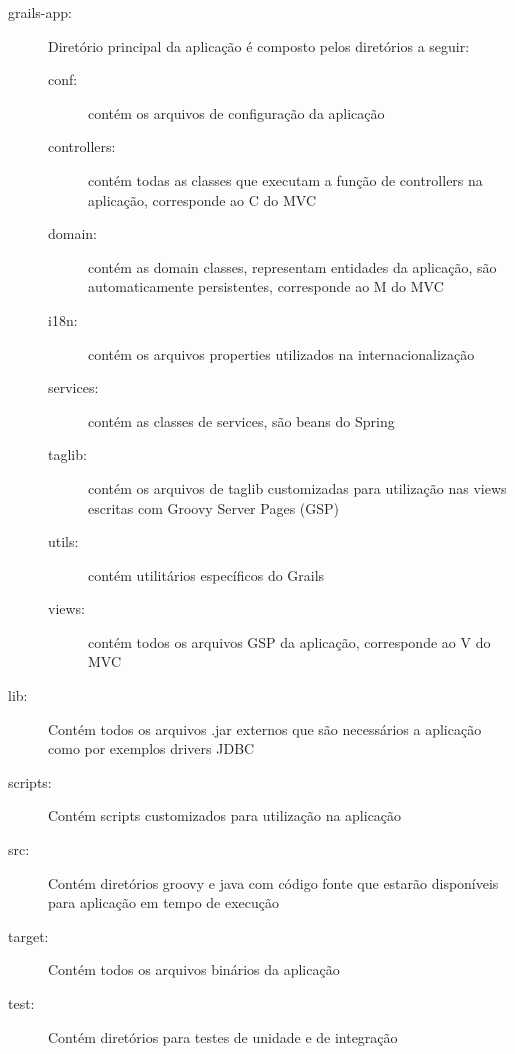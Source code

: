 \documentclass[12pt]{article}
\begin{document}
    \begin{description}
       \item [grails-app:] Diretório principal da aplicação é composto pelos diretórios a seguir:
            \begin{description}
                \item[conf:] contém os arquivos de configuração da aplicação
                \item[controllers:] contém todas as classes que executam a função de controllers na aplicação, corresponde ao C do MVC
                \item[domain:] contém as domain classes, representam entidades da aplicação, são automaticamente persistentes, corresponde ao M do MVC
                \item[i18n:] contém os arquivos properties utilizados na internacionalização
                \item[services:] contém as classes de services, são beans do Spring
                \item[taglib:] contém os arquivos de taglib customizadas para utilização nas views escritas com Groovy Server Pages (GSP)
                \item[utils:] contém utilitários específicos do Grails
                \item[views:] contém todos os arquivos GSP da aplicação, corresponde ao V do MVC
            \end{description}
        \item[lib:] Contém todos os arquivos .jar externos que são necessários a aplicação como por exemplos drivers JDBC 
        \item[scripts:] Contém scripts customizados para utilização na aplicação
        \item[src:] Contém diretórios groovy e java com código fonte que estarão disponíveis para aplicação em tempo de execução
        \item[target:] Contém todos os arquivos binários da aplicação
        \item[test:] Contém diretórios para testes de unidade e de integração
   \end{description}
    
\end{document}
